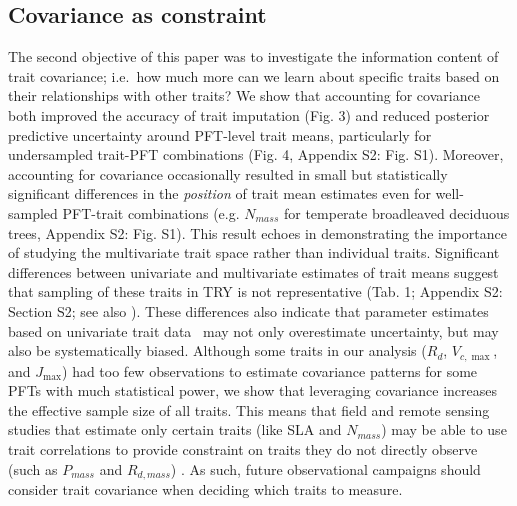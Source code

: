 \documentclass{article}
\begin{document}
\subsection{Covariance as constraint}

The second objective of this paper was to investigate the information content of trait covariance;
i.e.\ how much more can we learn about specific traits based on their relationships with other traits?
We show that accounting for covariance both improved the accuracy of trait imputation (Fig. 3) and reduced posterior predictive uncertainty around PFT-level trait means, particularly for undersampled trait-PFT combinations (Fig. 4, Appendix S2: Fig. S1).
Moreover, accounting for covariance occasionally resulted in small but statistically significant differences in the \textit{position} of trait mean estimates even for well-sampled PFT-trait combinations (e.g. $N_{mass}$ for temperate broadleaved deciduous trees, Appendix S2: Fig. S1).
This result echoes \citet{diaz_2015_global} in demonstrating the importance of studying the multivariate trait space rather than individual traits.
Significant differences between univariate and multivariate estimates of trait means suggest that sampling of these traits in TRY is not representative (Tab. 1; Appendix S2: Section S2; see also \citealt{kattge_2011_try}).
These differences also indicate that parameter estimates based on univariate trait data~\cite[e.g.,][]{lebauer_2013_facilitating,dietze_2014_quantitative,butler_2017_mapping} may not only overestimate uncertainty, but may also be systematically biased.
Although some traits in our analysis ($R_{d}$, $V_{c,\max}$, and $J_{\max}$) had too few observations to estimate covariance patterns for some PFTs with much statistical power,
we show that leveraging covariance increases the effective sample size of all traits.
This means that field and remote sensing studies that estimate only certain traits (like SLA and $N_{mass}$) may be able to use trait correlations to provide constraint on traits they do not directly observe (such as $P_{mass}$ and $R_{d,mass}$) \citep{singh_2015_imaging,musavi_2015_imprint,lepine_2016_examining,serbin_2014_spectroscopic}.
As such, future observational campaigns should consider trait covariance when deciding which traits to measure.
\end{document}
